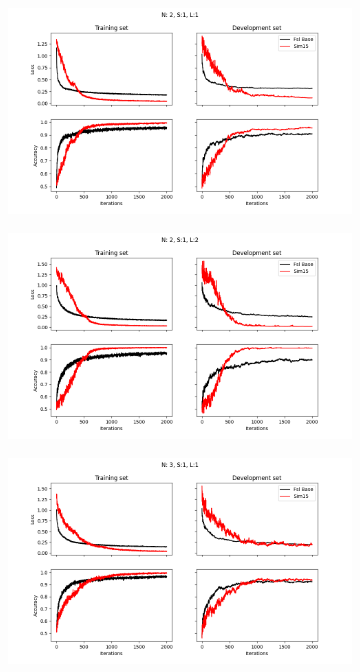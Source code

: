 \begin{figure}[H]
\centering
\begin{subfigure}[b]{.49\textwidth}
    \centering
    \includegraphics[width=\textwidth]{figures/comparison/Epochs_2000--A_0.05--N_2--S_1--L_1.png}
\end{subfigure}
\begin{subfigure}[b]{.49\textwidth}
    \centering
    \includegraphics[width=\textwidth]{figures/comparison/Epochs_2000--A_0.05--N_2--S_1--L_2.png}
\end{subfigure}
\begin{subfigure}[b]{.49\textwidth}
    \centering
    \includegraphics[width=\textwidth]{figures/comparison/Epochs_2000--A_0.05--N_3--S_1--L_1.png}

\end{subfigure}
\end{figure}

